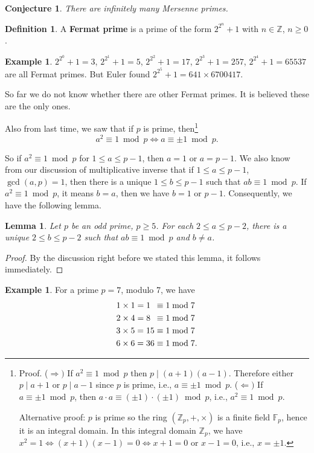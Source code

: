 \documentclass{amsbook}
\theoremstyle{plain}
\newtheorem{conjecture}[theorem]{Conjecture}
\newtheorem{lemma}[theorem]{Lemma}
\theoremstyle{definition}
\newtheorem{definition}[theorem]{Definition}
\newtheorem{example}[theorem]{Example}
\theoremstyle{remark}
\numberwithin{equation}{chapter}
\numberwithin{figure}{chapter}
\newcommand{\Z}{\mathbb{Z}}
\begin{document}
\begin{conjecture}\label{conj:inf_mersenne}
  There are infinitely many Mersenne primes.
\end{conjecture}
\begin{definition}
  A \textbf{Fermat prime} is a prime of the form $2^{2^n} + 1$ with $n \in \Z$, $n \geqslant 0$.
\end{definition}
\begin{example}
  $2^{2^0} + 1 = 3$, $2^{2^1} + 1 = 5$, $2^{2^2} + 1 = 17$, $2^{2^3} + 1 = 257$, $2^{2^4} + 1 = 65537$ are all Fermat primes. But Euler found $2^{2^5} + 1 = 641 \times 6700417$. 
\end{example}
So far we do not know whether there are other Fermat primes. It is believed these are the only ones.

Also from last time, we saw that if $p$ is prime, then\footnote{Proof. ($\Rightarrow)$ If $a^2 \equiv 1 \bmod p$ then $p \mid (a+1)(a-1)$. Therefore either $p \mid a+1$ or $p \mid a - 1$ since $p$ is prime, i.e., $a \equiv \pm 1 \bmod p$. ($\Leftarrow)$ If $a \equiv \pm 1 \bmod p$, then $a \cdot a \equiv (\pm 1) \cdot (\pm 1) \bmod p$, i.e., $a^2 \equiv 1 \bmod p$.

  Alternative proof: $p$ is prime so the ring $(\Z_p, +, \times)$ is a finite field $\mathbb{F}_p$, hence it is an integral domain. In this integral domain $\Z_p$, we have $x^2 = 1 \iff (x+1)(x-1) = 0 \iff x + 1 = 0 \text{ or } x - 1 = 0$, i.e., $x = \pm 1$.}
\[
  a^2 \equiv 1 \bmod p \iff a \equiv \pm 1 \bmod p.
\]

So if $a^2 \equiv 1 \bmod p$ for $1 \leqslant a \leqslant p - 1$, then $a = 1$ or $a = p - 1$.
We also know from our discussion of multiplicative inverse that if $1 \leqslant a \leqslant p - 1$, $\gcd(a, p) = 1$, then there is a unique $1 \leqslant b \leqslant p - 1$ such that $ab \equiv 1 \bmod p$. If $a^2 \equiv 1 \bmod p$, it  means $b = a$, then we have $b = 1 \text{ or } p-1$. Consequently, we have the following lemma.

\begin{lemma}\label{lem:wilson_pf}
  Let $p$ be an odd prime, $p \geqslant 5$. For each $2 \leqslant a \leqslant p - 2$, there is a unique $2 \leqslant b \leqslant p - 2$ such that $ab \equiv 1 \bmod p$ and $b \neq a$.
\end{lemma}
\begin{proof}
  By the discussion right before we stated this lemma, it follows immediately.
\end{proof}
\begin{example}
  For a prime $p = 7$, modulo 7, we have
  \begin{align}
    1 \times 1 = 1 \hspace{1.7mm} &\equiv 1 \bmod 7 \\
    2 \times 4 = 8 \hspace{1.7mm} &\equiv 1 \bmod 7 \\
    3 \times 5 = 15 &\equiv 1 \bmod 7 \\
    6 \times 6 = 36 &\equiv 1 \bmod 7.
  \end{align}
\end{example}
\end{document}

